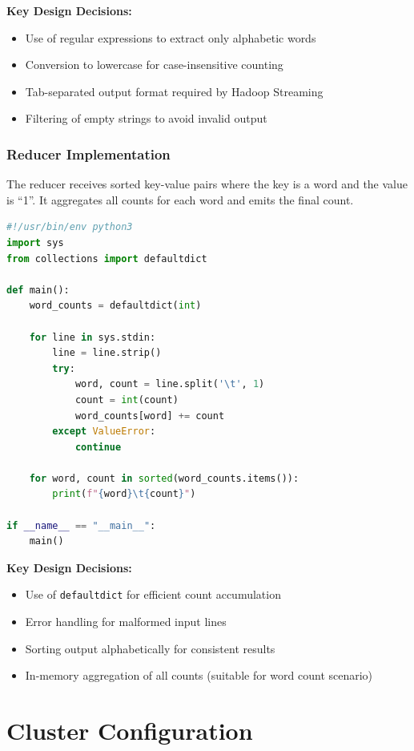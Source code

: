 \documentclass[11pt,a4paper]{article}
\begin{document}
\textbf{Key Design Decisions:}
\begin{itemize}
    \item Use of regular expressions to extract only alphabetic words
    \item Conversion to lowercase for case-insensitive counting
    \item Tab-separated output format required by Hadoop Streaming
    \item Filtering of empty strings to avoid invalid output
\end{itemize}

\subsubsection{Reducer Implementation}

The reducer receives sorted key-value pairs where the key is a word and the value is ``1''. It aggregates all counts for each word and emits the final count.

\begin{lstlisting}[language=Python, caption=Reducer Code (reducer.py)]
#!/usr/bin/env python3
import sys
from collections import defaultdict

def main():
    word_counts = defaultdict(int)
    
    for line in sys.stdin:
        line = line.strip()
        try:
            word, count = line.split('\t', 1)
            count = int(count)
            word_counts[word] += count
        except ValueError:
            continue
    
    for word, count in sorted(word_counts.items()):
        print(f"{word}\t{count}")

if __name__ == "__main__":
    main()
\end{lstlisting}

\textbf{Key Design Decisions:}
\begin{itemize}
    \item Use of \texttt{defaultdict} for efficient count accumulation
    \item Error handling for malformed input lines
    \item Sorting output alphabetically for consistent results
    \item In-memory aggregation of all counts (suitable for word count scenario)
\end{itemize}

\section{Cluster Configuration}
\end{document}
